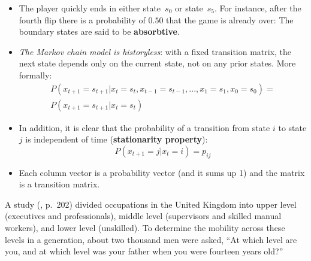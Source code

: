 \documentclass[c]{beamer}
\begin{document}
\begin{frame}
\begin{itemize}
    \item The player quickly ends in either state~$s_0$
    or state~$s_5$. For instance, after the fourth flip there is a probability of $0.50$ that
    the game is already over: The boundary states
    are said to be {\bf absorbtive}.
    \item {\em The Markov chain model is
    historyless}: with a fixed transition matrix, the next state depends only on the current state,
    not on any prior states. More formally:
    \begin{eqnarray*}
    P(x_{t+1}=s_{t+1}|x_t=s_t, x_{t-1}=s_{t-1},...,x_1=s_1,x_0=s_0)=\\
    P(x_{t+1}=s_{t+1}|x_t=s_t)
  \end{eqnarray*}
    \item In addition, it is clear that the probability of a transition from state $i$ to state $j$ is independent of time ({\bf stationarity property}):
    \[
    P(x_{t+1}=j|x_t=i)=p_{ij}
    \]
    \item Each column vector is a probability vector (and it sums up 1) and the matrix is a transition matrix.
\end{itemize}
\end{frame}

\begin{frame}

\begin{Exercise}
    A study (\cite{MacdonaldRidge}, p.~202)
divided occupations in the United Kingdom into
upper level (executives and professionals),
middle level (supervisors and skilled manual workers),
and lower level (unskilled).
To determine
the mobility across these levels in a generation, about
two thousand men were asked, ``At which level are you,
and at which level was your father when you were fourteen years old?''
\end{Exercise}
\end{frame}
\end{document}
